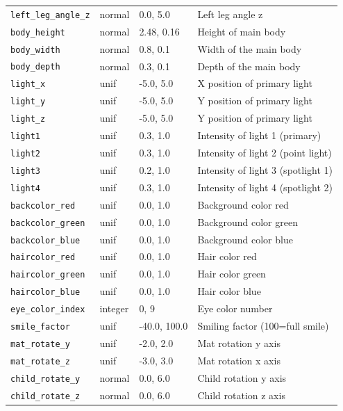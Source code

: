 \documentclass{article}
\begin{document}
\begin{table}[h]
{\begin{tabular}{|l|l|l|l|}
    \texttt{left\_leg\_angle\_z} & normal & 0.0, 5.0 &  Left leg angle z\\ 
    \texttt{body\_height} & normal & 2.48, 0.16 & Height of main body \\ 
    \texttt{body\_width} & normal & 0.8, 0.1 & Width of the main body \\
    \texttt{body\_depth} & normal & 0.3, 0.1 & Depth of the main body \\
    \texttt{light\_x} & unif & -5.0, 5.0 & X position of primary light  \\ 
    \texttt{light\_y} & unif & -5.0, 5.0 & Y position of primary light \\ 
    \texttt{light\_z} & unif & -5.0, 5.0 & Y position of primary light \\ 
    \texttt{light1} & unif & 0.3, 1.0 & Intensity of light 1 (primary) \\ 
    \texttt{light2} & unif & 0.3, 1.0 & Intensity of light 2 (point light) \\ 
    \texttt{light3} & unif & 0.2, 1.0 & Intensity of light 3 (spotlight 1) \\
    \texttt{light4} & unif & 0.3, 1.0 & Intensity of light 4 (spotlight 2) \\ 
    \texttt{backcolor\_red} & unif & 0.0, 1.0 & Background color red \\ 
    \texttt{backcolor\_green} & unif & 0.0, 1.0 &  Background color green\\ 
    \texttt{backcolor\_blue} & unif & 0.0, 1.0 & Background color blue \\ 
    \texttt{haircolor\_red} & unif & 0.0, 1.0 &  Hair color red\\ 
    \texttt{haircolor\_green} & unif & 0.0, 1.0 & Hair color green \\ 
    \texttt{haircolor\_blue} & unif & 0.0, 1.0 & Hair color blue \\ 
    \texttt{eye\_color\_index} & integer & 0, 9 & Eye color number \\ 
    \texttt{smile\_factor} & unif & -40.0, 100.0 & Smiling factor (100=full smile) \\ 
    \texttt{mat\_rotate\_y} & unif & -2.0, 2.0 & Mat rotation y axis \\ 
    \texttt{mat\_rotate\_z} & unif & -3.0, 3.0 & Mat rotation x axis \\ 
    \texttt{child\_rotate\_y} & normal & 0.0, 6.0 & Child rotation y axis \\ 
    \texttt{child\_rotate\_z} & normal & 0.0, 6.0 & Child rotation z axis \\ 

\end{tabular}}
\end{table}
\end{document}
